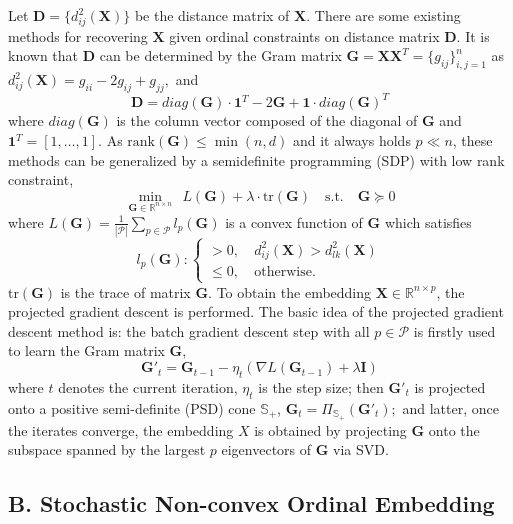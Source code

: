 \documentclass[letterpaper]{article} %
\begin{document}
Let $\mathbf{D}=\{d^2_{ij}(\mathbf{X})\}$ be the distance matrix of $\mathbf{X}$. There are some existing methods for recovering $\mathbf{X}$ given ordinal constraints on distance matrix $\mathbf{D}$. It is known that $\mathbf{D}$ can be determined by the Gram matrix $\mathbf{G} = \mathbf{X}\mathbf{X}^T = \{g_{ij}\}^{n}_{i,j=1}$ as
$
	d^2_{ij}(\mathbf{X}) = g_{ii}-2g_{ij}+g_{jj},
$
and
$$
	\mathbf{D} = \textit{diag}(\mathbf{G})\cdot\mathbf{1}^T-2\mathbf{G}+\mathbf{1}\cdot\textit{diag}(\mathbf{G})^T
$$
where $\textit{diag}(\mathbf{G})$ is the column vector composed of the diagonal of $\mathbf{G}$ and $\mathbf{1}^T=[1,\dots,1]$. As $\text{rank}(\mathbf{G})\leq\min(n, d)$ and it always holds $p\ll n$, these methods \cite{agarwal2007generalized,tamuz2011adaptiive,vandermaaten2012stochastic} can be generalized by a semidefinite programming (SDP) with low rank constraint,
\begin{equation}
	\label{eq:1}
		\underset{\mathbf{G}\in\mathbb{R}^{n\times n}}{\min} \ \ L(\mathbf{G})+\lambda\cdot\text{tr}(\mathbf{G}) \quad
		\text{s.t.} \quad \mathbf{G}\succeq 0
\end{equation}
where
$
	L(\mathbf{G})=\frac{1}{|\mathcal{P}|}\sum_{p\in\mathcal{P}}l_p(\mathbf{G})
$
is a convex function of $\mathbf{G}$ which satisfies
\begin{equation*}
	l_p(\mathbf{G}):
	\left\{
	\begin{matrix}
	> 0,\ & d^2_{ij}(\mathbf{X}) > d^2_{lk}(\mathbf{X})\\
	\leq 0,\ & \text{otherwise.}
	\end{matrix}
	\right.
\end{equation*}
$\text{tr}(\mathbf{G})$ is the trace of matrix $\mathbf{G}$. To obtain the embedding $\mathbf{X}\in\mathbb{R}^{n\times p}$, the projected gradient descent is performed. The basic idea of the projected gradient descent method is: the batch gradient descent step with all $p\in\mathcal{P}$ is firstly used to learn the Gram matrix $\mathbf{G}$,
$$
	{\mathbf{G}}'_{t} = \mathbf{G}_{t-1}-\eta_{t}(\nabla L(\mathbf{G}_{t-1})+\lambda \mathbf{I})
$$
where $t$ denotes the current iteration, $\eta_t$ is the step size; then ${\mathbf{G}}'_{t}$ is projected onto a positive semi-definite (PSD) cone $\mathbb{S}_+$,
$
	\mathbf{G}_{t} = \Pi_{\mathbb{S}_+}({\mathbf{G}}'_{t});
$
and latter, once the iterates converge, the embedding $X$ is obtained by projecting $\mathbf{G}$ onto the subspace spanned by the largest $p$ eigenvectors of $\mathbf{G}$ via SVD.

\subsection{B. Stochastic Non-convex Ordinal Embedding}
\end{document}
